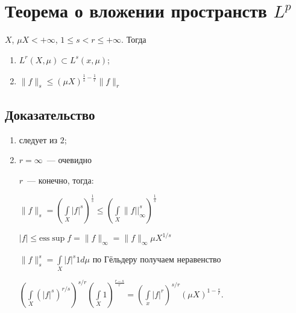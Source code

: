 \documentclass{article}
\begin{document}
    \newpage
    
    \section{Теорема о вложении пространств $L^p$}
    
        $X$, $\mu X < +\infty$, $1 \leqslant s < r \leqslant +\infty$. Тогда 
        
        \begin{enumerate}
            
            \item $L^r(X, \mu) \subset L^s(x, \mu)$;
            
            \item $\| f \|_s \leqslant (\mu X)^{\frac{1}{s} - \frac{1}{r}} \| f \|_r$
            
        \end{enumerate}
        
        \subsection{Доказательство}
        
            \begin{enumerate}
            
                \item следует из $2$;
                
                \item $r = \infty$~--- очевидно
                
                    $r$~--- конечно, тогда:
                
                    $\| f \|_s = \left( \int\limits_X |f|^s \right)^{\frac{1}{s}} \leqslant \left( \int\limits_X \| f ||^s_{\infty} \right)^{\frac{1}{s}}$
                    
                    $|f| \leqslant \mathrm{ess}\sup f = \| f \|_{\infty} = \| f \|_{\infty} \mu X^{1/s}$
                    
                    $\| f \|^s_s = \int\limits_X |f|^s 1 d \mu$ по Гёльдеру получаем неравенство
                    
                    $\left( \int\limits_X \left( |f|^s \right)^{r/s} \right)^{s/r} \left( \int\limits_X 1 \right)^{\frac{r - s}{r}} = \left( \int\limits_x |f|^r \right)^{s/r} \left( \mu X \right)^{1 - \frac{s}{r}}$.
                
            \end{enumerate}
            
\end{document}
